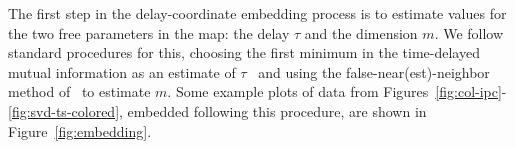 The first step in the delay-coordinate embedding process is to
estimate values for the two free parameters in the map: the delay
$\tau$ and the dimension $m$.  We follow standard procedures for this,
choosing the first minimum in the time-delayed mutual information as
an estimate of $\tau$~\cite{fraser-swinney} and using the
false-near(est)-neighbor method of~\cite{KBA92} to estimate $m$.  Some
example plots of data from
Figures~\ref{fig:col-ipc}-\ref{fig:svd-ts-colored}, embedded following
this procedure, are shown in Figure~\ref{fig:embedding}.
%
%
%
